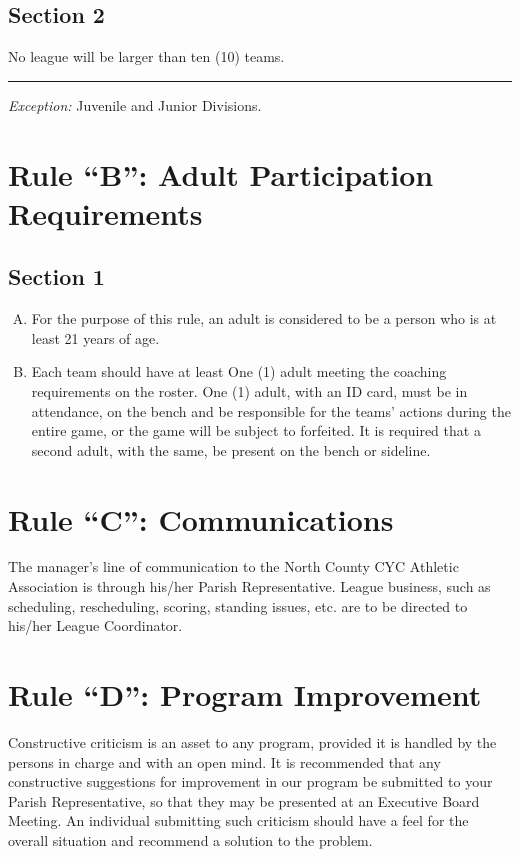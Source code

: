 \subsection{Section 2}
No league will be larger than ten (10) teams.
\plainbreak{1}
{\em Exception:}  Juvenile and Junior Divisions.

\section{Rule ``B'': Adult Participation Requirements}
\label{sec:rules-b}
\subsection{Section 1}
\label{ssec:rules-b-1}
\begin{enumerate}[A.]
    \item For the purpose of this rule, an adult is considered to be a person who is at least 21 years of age.
    \item Each team should have at least One (1) adult meeting the coaching requirements on the roster. One (1) adult, with an ID card, must be in attendance, on the bench and be responsible for the teams’ actions during the entire game, or the game will be subject to forfeited.  It is required that a second adult, with the same, be present on the bench or sideline.
\end{enumerate}

\section{Rule ``C'': Communications}
\label{sec:rules-c}
The manager's line of communication to the North County CYC Athletic Association is through his/her Parish Representative. League business, such as scheduling, rescheduling, scoring, standing issues, etc. are to be directed to his/her League Coordinator.

\section{Rule ``D'': Program Improvement}
\label{sec:rules-d}
Constructive criticism is an asset to any program, provided it is handled by the persons in charge and with an open mind.  It is recommended that any constructive suggestions for improvement in our program be submitted to your Parish Representative, so that they may be presented at an Executive Board Meeting.  An individual submitting such criticism should have a feel for the overall situation and recommend a solution to the problem.

